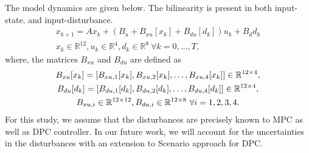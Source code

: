 The model dynamics are given below. The bilinearity is present in both input-state, and input-disturbance.
\begin{gather}
\label{E:bilinear1}
x_{k+1} = Ax_{k}+(B_u +B_{xu}[x_k] + B_{du}[d_k]) u_k+B_dd_k \\
x_{k} \in \mathbb{R}^{12}, u_{k} \in \mathbb{R}^{4}, d_{k} \in \mathbb{R}^{8} \ \forall k = 0,\dots,T, \nonumber
\end{gather}
where, the matrices $B_{xu}$ and $B_{du}$ are defined as
\begin{gather}
\label{E:bilinear2}
B_{xu}[x_k] = [ B_{xu,1}[x_k],B_{xu,2}[x_k], \dots, B_{xu,4}[x_k] ] \in \mathbb{R}^{12\times4}, \nonumber\\
B_{du}[d_k] = [ B_{du,1}[d_k],B_{du,2}[d_k], \dots, B_{du,4}[d_k] ] \in \mathbb{R}^{12\times4}\nonumber, \\
B_{xu,i} \in \mathbb{R}^{12\times12}, B_{du,i} \in \mathbb{R}^{12\times8} \ \forall i=1,2,3,4.\nonumber
\end{gather}
For this study, we assume that the disturbances are precisely known to MPC as well as DPC controller. In our future work, we will account for the uncertainties in the disturbances with an extension to Scenario approach \cite{Bernardini2009} for DPC.